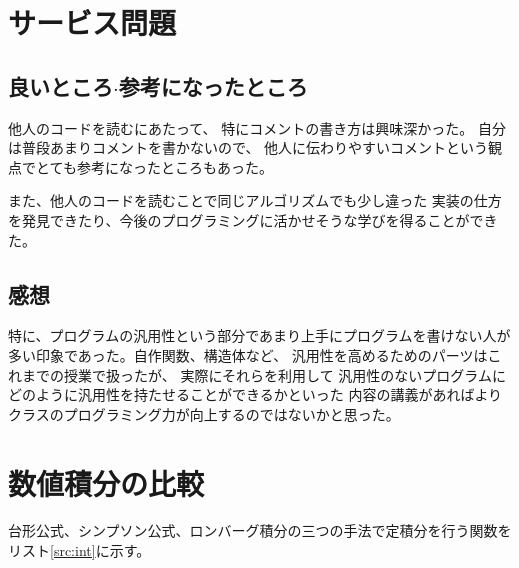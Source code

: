 \documentclass{jsarticle}
\begin{document}
    \section{サービス問題}
        \subsection{良いところ$\cdot$参考になったところ}
            他人のコードを読むにあたって、
            特にコメントの書き方は興味深かった。
            自分は普段あまりコメントを書かないので、
            他人に伝わりやすいコメントという観点でとても参考になったところもあった。

            また、他人のコードを読むことで同じアルゴリズムでも少し違った
            実装の仕方を発見できたり、今後のプログラミングに活かせそうな学びを得ることができた。

        \subsection{感想}
            特に、プログラムの汎用性という部分であまり上手にプログラムを書けない人が
            多い印象であった。自作関数、構造体など、
            汎用性を高めるためのパーツはこれまでの授業で扱ったが、
            実際にそれらを利用して
            汎用性のないプログラムにどのように汎用性を持たせることができるかといった
            内容の講義があればよりクラスのプログラミング力が向上するのではないかと思った。
    
    \section{数値積分の比較}
        台形公式、シンプソン公式、ロンバーグ積分の三つの手法で定積分を行う関数をリスト\ref{src:int}に示す。
\end{document}

